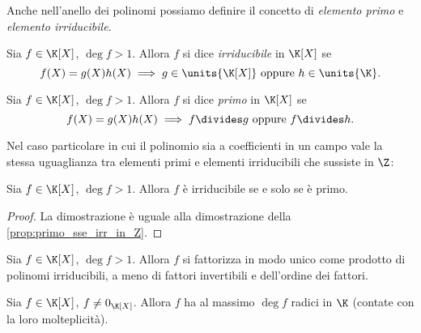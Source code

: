Anche nell'anello dei polinomi possiamo definire il concetto di \emph{elemento primo} e \emph{elemento irriducibile}.

\begin{definition}
    Sia $f \in \K[X]$, $\deg f > 1$. Allora $f$ si dice \emph{irriducibile} in $\K[X]$ se \[
        f(X) = g(X)h(X) \implies g \in \units{\K[X]} \text{ oppure } h \in \units{\K}.
    \]
\end{definition}

\begin{definition}
    Sia $f \in \K[X]$, $\deg f > 1$. Allora $f$ si dice \emph{primo} in $\K[X]$ se \[
        f(X) = g(X)h(X) \implies f \divides g \text{ oppure } f \divides h.
    \]
\end{definition}

Nel caso particolare in cui il polinomio sia a coefficienti in un campo vale la stessa uguaglianza tra elementi primi e elementi irriducibili che sussiste in $\Z$:

\begin{proposition}
    Sia $f \in \K[X]$, $\deg f > 1$. Allora $f$ è irriducibile se e solo se è primo.
\end{proposition}
\begin{proof}
    La dimostrazione è uguale alla dimostrazione della \autoref{prop:primo_sse_irr_in_Z}.
\end{proof}

\begin{theorem}
    \label{th:fatt_unica}
    Sia $f \in \K[X]$, $\deg f > 1$. Allora $f$ si fattorizza in modo unico come prodotto di polinomi irriducibili, a meno di fattori invertibili e dell'ordine dei fattori.
\end{theorem}

\begin{corollary}
    Sia $f \in \K[X]$, $f \neq 0_{\K[X]}$. Allora $f$ ha al massimo $\deg f$ radici in $\K$ (contate con la loro molteplicità).
\end{corollary}